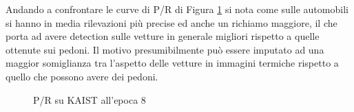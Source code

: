 Andando a confrontare le curve di P/R di Figura \ref{fig:test_kaist_ep8} si nota come sulle automobili si hanno in media rilevazioni più precise ed anche un richiamo maggiore, il che porta ad avere detection sulle vetture in generale migliori rispetto a quelle ottenute sui pedoni. Il motivo presumibilmente può essere imputato ad una maggior somiglianza tra l'aspetto delle vetture in immagini termiche rispetto a quello che possono avere dei pedoni.  
\begin{figure}
    \begin{minipage}{.5\linewidth}
        \centering
    \end{minipage}%
    \begin{minipage}{.5\linewidth}
        \centering
    \end{minipage}
    \centering
    \caption{P/R su KAIST all'epoca 8}
    \label{fig:test_kaist_ep8}
\end{figure}



